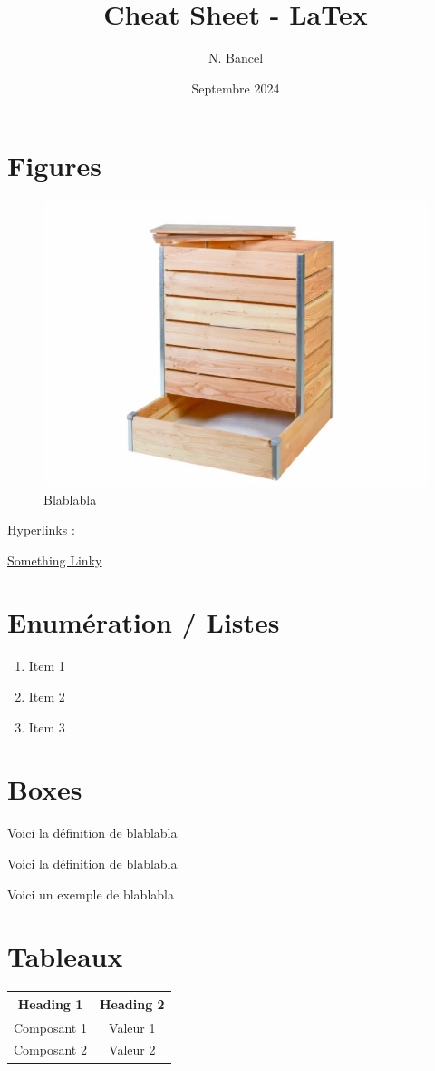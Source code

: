 \documentclass[a4paper,12pt]{article}
\begin{document}
\title{Cheat Sheet - LaTex}
\author{N. Bancel}
\date{Septembre 2024}
\maketitle

\section{Figures}

\begin{figure}[H]
  \centering
  \includegraphics[width=0.3\linewidth]{lombri.jpg}
  \caption{\label{} Blablabla}
\end{figure}

Hyperlinks : 

\href{http://www.overleaf.com}{Something Linky} 

\section{Enumération / Listes}

\begin{enumerate}[noitemsep]
  \item Item 1
  \item Item 2
  \item Item 3
\end{enumerate}

\section{Boxes}

\begin{tcolorbox}[colback=red!10!white, colframe=red!75!black, title=PAR COEUR]
  Voici la définition de blablabla
\end{tcolorbox}


\begin{tcolorbox}[colback=green!10!white, colframe=green!75!black, title=Définition : xxx]
  Voici la définition de blablabla
\end{tcolorbox}

\begin{tcolorbox}[colback=blue!10!white, colframe=blue!75!black, title=Exemples - Application]
  Voici un exemple de blablabla
\end{tcolorbox}

\section{Tableaux}

\begin{tabular}{SS}
  \toprule
  {Heading 1} & {Heading 2} \\
  \midrule
  {Composant 1} & {Valeur 1} \\
  {Composant 2} & {Valeur 2} \\
  \bottomrule
\end{tabular}
\end{document}
